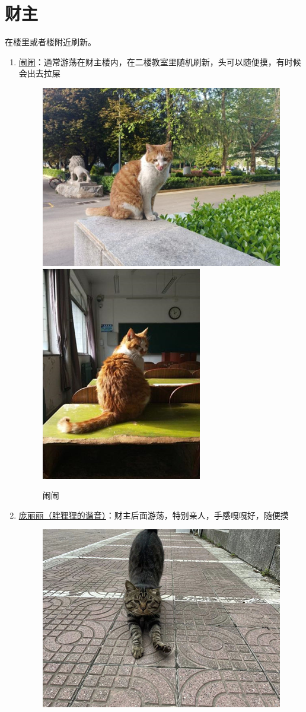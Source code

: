 \documentclass[zihao=-4,fontset=none]{Beautybook-CN}
\begin{document}
\section{财主}
在楼里或者楼附近刷新。
\begin{enumerate}
    \item \hyperref[img2829]{闹闹}：通常游荡在财主楼内，在二楼教室里随机刷新，头可以随便摸，有时候会出去拉屎
    \begin{figure}[htbp]
            \centering
            \includegraphics[width=0.4\linewidth]{media/cimage28.png}
        \qquad
            \includegraphics[width=0.4\linewidth]{media/cimage29.png}
            \caption{闹闹}
            \label{img2829}
    \end{figure}
    \item \hyperref[img3031]{庞丽丽（胖狸狸的谐音）}：财主后面游荡，特别亲人，手感嘎嘎好，随便摸
    \begin{figure}[htbp]
            \centering
            \includegraphics[width=0.4\linewidth]{media/cimage30.png}
        \qquad

\end{figure}
\end{enumerate}
\end{document}

